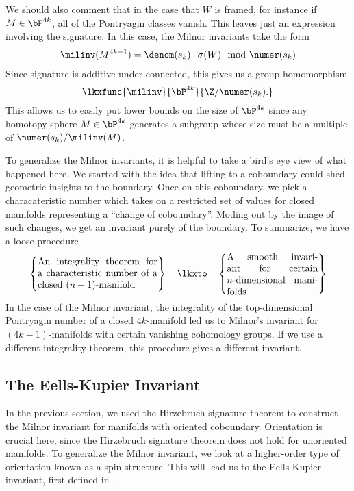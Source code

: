 We should also comment that in the case that $W$ is framed, for instance if $M\in \bP^{4k}$, all of the Pontryagin classes vanish. This leaves just an expression involving the signature. In this case, the Milnor invariants take the form
\[
	\begin{aligned}
		\milinv(M^{4k-1}) = \denom(s_k)\cdot \sigma(W)\mod \numer(s_k)
	\end{aligned}
\]
Since signature is additive under connected, this gives us a group homomorphism
\[
	\lkxfunc{\milinv}{\bP^{4k}}{\Z/\numer(s_k).}
\]
This allows us to easily put lower bounds on the size of $\bP^{4k}$ since any homotopy sphere $M\in \bP^{4k}$ generates a subgroup whose size must be a multiple of $\numer(s_k)/\milinv(M)$. 

To generalize the Milnor invariants, it is helpful to take a bird's eye view of what happened here. We started with the idea that lifting to a coboundary could shed geometric insights to the boundary. Once on this coboundary, we pick a characateristic number which takes on a restricted set of values for closed manifolds representing a ``change of coboundary''. Moding out by the image of such changes, we get an invariant purely of the boundary. To summarize, we have a loose procedure
\[
	\left\{\parbox{12.5em}{An integrality theorem for a characteristic number of a closed $(n+1)$-manifold}\right\}
	\quad\lkxto\quad
	\left\{\parbox{9.5em}{A smooth invariant for certain $n$-dimensional manifolds}\right\}
\]
In the case of the Milnor invariant, the integrality of the top-dimensional Pontryagin number of a closed $4k$-manifold led us to Milnor's invariant for $(4k-1)$-manifolds with certain vanishing cohomology groups.
If we use a different integrality theorem, this procedure gives a different invariant.

\subsection{The Eells-Kupier Invariant}\label{sec:eells-kupier-invariant}

In the previous section, we used the Hirzebruch signature theorem to construct the Milnor invariant for manifolds with oriented coboundary. Orientation is crucial here, since the Hirzebruch signature theorem does not hold for unoriented manifolds. To generalize the Milnor invariant, we look at a higher-order type of orientation known as a spin structure. This will lead us to the Eells-Kupier invariant, first defined in \cite{eellskupier1962}.

